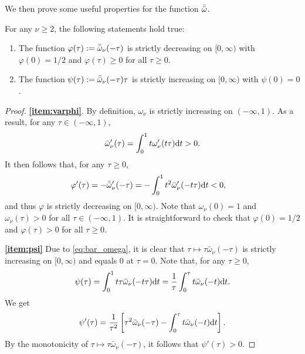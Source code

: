 We then prove some useful properties for the function $\bar{\bar{\omega}}$.
\begin{lemma}
\label{lem:monotonicity}
    For any $\nu \ge 2$, the following statements hold true:
    \begin{enumerate}[label=(\alph*)]
        \item\label{item:varphi} The function $\varphi(\tau) := \bar{\bar{\omega}}_\nu(-\tau)$ is strictly decreasing on $[0, \infty)$ with $\varphi(0) = 1/2$ and $\varphi(\tau) \ge 0$ for all $\tau \ge 0$.
        \item\label{item:psi} The function $\psi(\tau) := \bar{\bar{\omega}}_\nu(-\tau) \tau$ is strictly increasing on $[0, \infty)$ with $\psi(0) = 0$.
    \end{enumerate}
\end{lemma}
\begin{proof}
    \textbf{\ref{item:varphi}}.
    By definition, $\omega_\nu$ is strictly increasing on $(-\infty, 1)$.
    As a result, for any $\tau \in (-\infty, 1)$,
    \begin{align*}
        \bar \omega_\nu'(\tau) = \int_0^1 t \omega_\nu'(t \tau) \mathrm{d} t > 0.
    \end{align*}
    It then follows that, for any $\tau \ge 0$,
    \begin{align*}
        \varphi'(\tau)
        &= - \bar{\bar{\omega}}_\nu'(-\tau)
        = -\int_0^1 t^2 \bar \omega_\nu'(-t\tau) \mathrm{d} t < 0,
    \end{align*}
    and thus $\varphi$ is strictly decreasing on $[0, \infty)$.
    Note that $\omega_\nu(0) = 1$ and $\omega_\nu(\tau) > 0$ for all $\tau \in (-\infty, 1)$.
    It is straightforward to check that $\varphi(0) = 1/2$ and $\varphi(\tau) > 0$ for all $\tau \ge 0$.
    
    \textbf{\ref{item:psi}} Due to \eqref{eq:bar_omega}, it is clear that $\tau \mapsto \tau \bar \omega_\nu(-\tau)$ is strictly increasing on $[0, \infty)$ and equals 0 at $\tau = 0$.
    Note that, for any $\tau \ge 0$,
    \begin{align*}
        \psi(\tau) = \int_0^1 t\tau \bar \omega_\nu(-t\tau) \mathrm{d} t = \frac1\tau \int_0^\tau t \bar \omega_\nu(-t) \mathrm{d} t.
    \end{align*}
    We get
    \begin{align*}
        \psi'(\tau) = \frac1{\tau^2} \left[ \tau^2 \bar \omega_\nu(-\tau) - \int_0^\tau t \bar \omega_\nu(-t) \mathrm{d} t \right].
    \end{align*}
    By the monotonicity of $\tau \mapsto \tau \bar \omega_\nu(-\tau)$, it follows that $\psi'(\tau) > 0$.
\end{proof}

